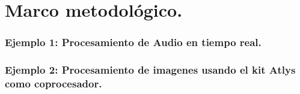 
\part{Marco metodol\'{o}gico.}

\section{Ejemplo 1: Procesamiento de Audio en tiempo real.}

\section{Ejemplo 2: Procesamiento de imagenes usando el kit Atlys como coprocesador.}

\newpage{}
